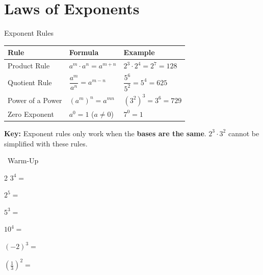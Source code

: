 \section{Laws of Exponents}

\begin{quickReview}{Exponent Rules}
\begin{center}
\begin{tabular}{l l l}
    \textbf{Rule} & \textbf{Formula} & \textbf{Example} \\
    \hline
    Product Rule & $a^m \cdot a^n = a^{m+n}$ & $2^3 \cdot 2^4 = 2^7 = 128$ \\
    Quotient Rule & $\dfrac{a^m}{a^n} = a^{m-n}$ & $\dfrac{5^6}{5^2} = 5^4 = 625$ \\
    Power of a Power & $(a^m)^n = a^{mn}$ & $(3^2)^3 = 3^6 = 729$ \\
    Zero Exponent & $a^0 = 1$ \;($a \neq 0$) & $7^0 = 1$ \\
\end{tabular}
\end{center}

\medskip
\textbf{Key:} Exponent rules only work when the \textbf{bases are the same}. $2^3 \cdot 3^2$ cannot be simplified with these rules.
\end{quickReview}

\begin{practiceBox}[funGreen]{\faSun~Warm-Up}


\begin{multicols}{2}
\prob $3^4 =$ \answerBlank[2cm]

\prob $2^5 =$ \answerBlank[2cm]

\prob $5^3 =$ \answerBlank[2cm]

\prob $10^4 =$ \answerBlank[2cm]

\prob $(-2)^3 =$ \answerBlank[2cm]

\prob $\left(\frac{1}{3}\right)^2 =$ \answerBlank[2cm]
\end{multicols}
\end{practiceBox}

